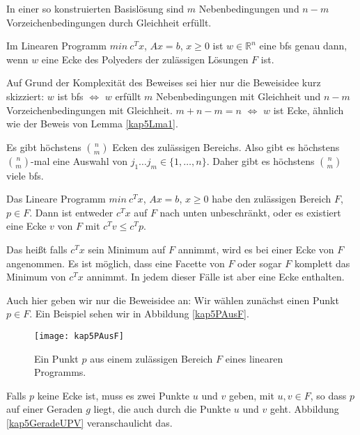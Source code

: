 In einer so konstruierten Basislösung sind $m$ Nebenbedingungen und $n-m$ Vorzeichenbedingungen durch Gleichheit erfüllt.

\begin{Satz}
  \hspace{\parindent}Im Linearen Programm $min~c^Tx$, $Ax = b$, $x \ge 0$ ist $w \in \mathbb{R}^n$ eine bfs genau dann, wenn $w$ eine Ecke des Polyeders der zulässigen Lösungen $F$ ist.
\end{Satz}

Auf Grund der Komplexität des Beweises sei hier nur die Beweisidee kurz skizziert: $w$ ist bfs $\Leftrightarrow$ $w$ erfüllt $m$ Nebenbedingungen mit Gleichheit und $n-m$ Vorzeichenbedingungen mit Gleichheit. $m + n - m = n$ $\Leftrightarrow$ $w$ ist Ecke, ähnlich wie der Beweis von Lemma \ref{kap5Lma1}.

\begin{Koro}
\hspace{\parindent}Es gibt höchstens $\binom{n}{m}$ Ecken des zulässigen Bereichs. Also gibt es höchstens $\binom{n}{m}$-mal eine Auswahl von $j_1 \ldots j_m \in \{ 1, \ldots, n \}$. Daher gibt es höchstens $\binom{n}{m}$ viele bfs.
\end{Koro}

\begin{Satz}
  \hspace{\parindent}Das Lineare Programm $min~c^Tx$, $Ax = b$, $x \ge 0$ habe den zulässigen Bereich $F$, $p\in F$. Dann ist entweder $c^Tx$ auf $F$ nach unten unbeschränkt, oder es existiert eine Ecke $v$ von $F$ mit $c^Tv \le c^T p$.
\end{Satz}

Das heißt falls $c^T x$ sein Minimum auf $F$ annimmt, wird es bei einer Ecke von $F$ angenommen. Es ist möglich, dass eine Facette von $F$ oder sogar $F$ komplett das Minimum von $c^T x$ annimmt. In jedem dieser Fälle ist aber eine Ecke enthalten.

Auch hier geben wir nur die Beweisidee an: Wir wählen zunächst einen Punkt $p \in F$. Ein Beispiel sehen wir in Abbildung \vref{kap5PAusF}.

\begin{figure}[hbt]
  \centering
  \texttt{[image: kap5PAusF]}
  \caption{Ein Punkt $p$ aus einem zulässigen Bereich $F$ eines linearen Programms.}
  \label{kap5PAusF}
\end{figure}

Falls $p$ keine Ecke ist, muss es zwei Punkte $u$ und $v$ geben, mit $u,v \in F$, so dass $p$ auf einer Geraden $g$ liegt, die auch durch die Punkte $u$ und $v$ geht. Abbildung \vref{kap5GeradeUPV} veranschaulicht das.

